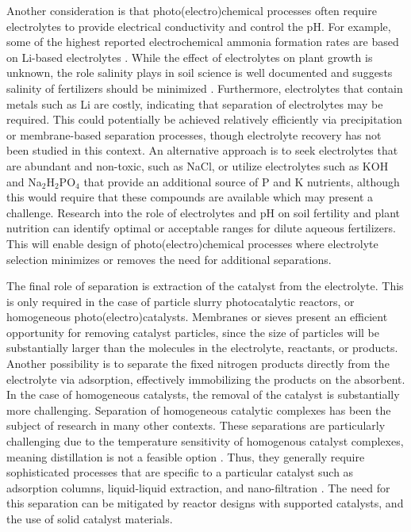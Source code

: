 Another consideration is that photo(electro)chemical processes often require electrolytes to provide electrical conductivity and control the pH. For example, some of the highest reported electrochemical ammonia formation rates are based on Li-based electrolytes \cite{Song_2018}. While the effect of electrolytes on plant growth is unknown, the role salinity plays in soil science is well documented and suggests salinity of fertilizers should be minimized \cite{hu2005drought}. Furthermore, electrolytes that contain metals such as Li are costly, indicating that separation of electrolytes may be required. This could potentially be achieved relatively efficiently via precipitation or membrane-based separation processes, though electrolyte recovery has not been studied in this context. An alternative approach is to seek electrolytes that are abundant and non-toxic, such as NaCl, or utilize electrolytes such as KOH and Na$_2$H$_2$PO$_4$ that provide an additional source of P and K nutrients, although this would require that these compounds are available which may present a challenge. Research into the role of electrolytes and pH on soil fertility and plant nutrition can identify optimal or acceptable ranges for dilute aqueous fertilizers. This will enable design of photo(electro)chemical processes where electrolyte selection minimizes or removes the need for additional separations.

The final role of separation is extraction of the catalyst from the electrolyte. This is only required in the case of particle slurry photocatalytic reactors, or homogeneous photo(electro)catalysts. Membranes or sieves present an efficient opportunity for removing catalyst particles, since the size of particles will be substantially larger than the molecules in the electrolyte, reactants, or products. Another possibility is to separate the fixed nitrogen products directly from the electrolyte via adsorption, effectively immobilizing the products on the absorbent. In the case of homogeneous catalysts, the removal of the catalyst is substantially more challenging. Separation of homogeneous catalytic complexes has been the subject of research in many other contexts. These separations are particularly challenging due to the temperature sensitivity of homogenous catalyst complexes, meaning distillation is not a feasible option \cite{Cole-Hamilton2003}. Thus, they generally require sophisticated processes that are specific to a particular catalyst such as adsorption columns, liquid-liquid extraction, and nano-filtration \cite{VuralGursel2015}. The need for this separation can be mitigated by reactor designs with supported catalysts, and the use of solid catalyst materials.


